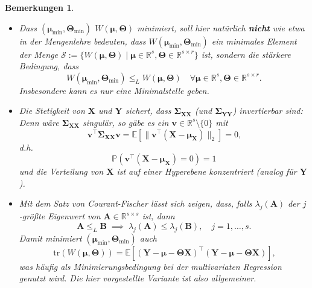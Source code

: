 \documentclass[]{article}
\newcommand{\Pb}{\mathbb{P}}
\newcommand{\E}{\mathbb{E}}
\newcommand{\R}{\mathbb{R}}
\newcommand{\X}{\mathbf{X}}
\newcommand{\Y}{\mathbf{Y}}
\newcommand{\T}{\mathbf{\Theta}}
\newcommand{\muu}{\bm{\mu}}
\newcommand{\Ssigma}{\mathbf{\Sigma}}
\newcommand{\vv}{\mathbf{v}}
\newcommand{\A}{\mathbf{A}}
\newcommand{\B}{\mathbf{B}}
\newcommand{\tr}{\mathrm{tr}}
\newtheorem*{remarks}{Bemerkungen}
\begin{document}
\begin{remarks}
	\hfill
	\normalfont
	\begin{itemize}
		\item Dass $(\muu_{\min}, \T_{\min})$ $W(\muu, \T)$ minimiert, soll hier natürlich \textbf{nicht} wie etwa in der Mengenlehre bedeuten, dass $W(\muu_{\min}, \T_{\min})$ ein minimales Element der Menge $\mathcal{S} := \{W(\muu, \T) \;|\; \muu \in \R^s, \T \in \R^{s \times r}\}$ ist, sondern die stärkere Bedingung, dass 
		$$W(\muu_{\min}, \T_{\min}) \leq_L W(\muu, \T) \quad \forall \muu \in \R^s, \T \in \R^{s \times r} \text{.}$$
		Insbesondere kann es nur eine Minimalstelle geben.
		\item Die Stetigkeit von $\X$ und $\Y$ sichert, dass $\Ssigma_{\X\X}$ (und $\Ssigma_{\Y\Y}$) invertierbar sind: Denn wäre $\Ssigma_{\X\X}$ singulär, so gäbe es ein $\vv \in \R^s \setminus \{0\}$ mit $$\vv^\top \Ssigma_{\X\X} \vv = \E [\| \vv^\top (\X - \muu_{\X}) \|_2] = 0 \text{,}$$
		d.h. $$\Pb(\vv^\top (\X - \muu_{\X}) = 0) = 1$$
		und die Verteilung von $\X$ ist auf einer Hyperebene konzentriert (analog für $\Y$). 
		\item Mit dem Satz von Courant-Fischer \cite[Seite 52 f.]{Iz08} lässt sich zeigen, dass, falls $\lambda_j(\A)$ der $j$-größte Eigenwert von $\A \in \R^{s\times s}$ ist, dann
		$$\A \leq_L \B \; \implies \; \lambda_j(\A) \leq \lambda_j(\B),  \quad j=1, \dots,s \text{.}$$
		Damit minimiert $(\muu_{\min}, \T_{\min})$ auch 
		\[\tr(W(\muu, \T)) = \E[(\Y - \muu - \T \X)^{\top} (\Y - \muu - \T \X)] \text{,} \label{eq:2.2} \tag{2.2}\]
		was häufig als Minimierungsbedingung bei der multivariaten Regression genutzt wird. Die hier vorgestellte Variante ist also allgemeiner.
	\end{itemize}
\end{remarks}
\end{document}
